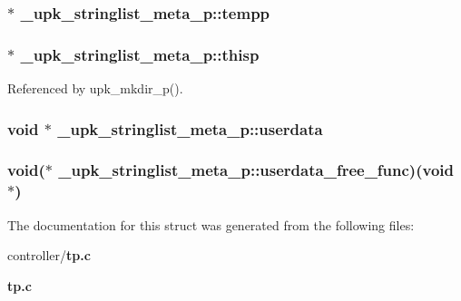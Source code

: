 \subsubsection[{tempp}]{ $\ast$ {\bf \_\-upk\_\-stringlist\_\-meta\_\-p::tempp}}\label{struct__upk__stringlist__meta__p_a85f0197665ad170fde62adc262883560}
\subsubsection[{thisp}]{ $\ast$ {\bf \_\-upk\_\-stringlist\_\-meta\_\-p::thisp}}\label{struct__upk__stringlist__meta__p_a3695103e7fc7dd1e3b7fae04ca47391e}


Referenced by upk\_\-mkdir\_\-p().

\subsubsection[{userdata}]{\setlength{\rightskip}{0pt plus 5cm}void $\ast$ {\bf \_\-upk\_\-stringlist\_\-meta\_\-p::userdata}}\label{struct__upk__stringlist__meta__p_ab2b00c69effff805db95ef334b272a86}
\subsubsection[{userdata\_\-free\_\-func}]{\setlength{\rightskip}{0pt plus 5cm}void($\ast$ {\bf \_\-upk\_\-stringlist\_\-meta\_\-p::userdata\_\-free\_\-func})(void $\ast$)}\label{struct__upk__stringlist__meta__p_a62c3ef7c99793a4a77bacdd911ff2db6}


The documentation for this struct was generated from the following files:\begin{DoxyCompactItemize}
\item 
controller/{\bf tp.c}\item 
{\bf tp.c}\end{DoxyCompactItemize}
